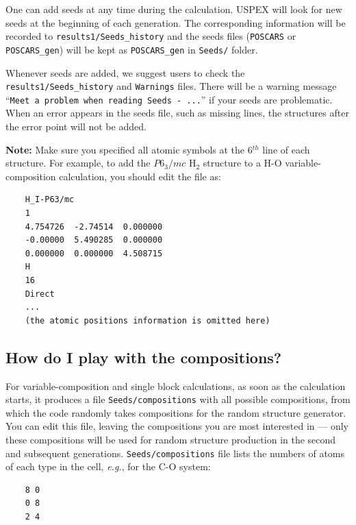 \documentclass[12pt]{article}
\newcommand{\file}[1]{\texttt{#1}}
\begin{document}
One can add  seeds at any time during the calculation. USPEX will look for new
seeds at the beginning of each generation. The corresponding information will be
recorded to \file{results1/Seeds\_history} and the seeds files (\file{POSCARS}
or \file{POSCARS\_gen}) will be kept as \file{POSCARS\_gen} in \file{Seeds/}
folder.

Whenever seeds are added, we suggest users to check the
\file{results1/Seeds\_history} and \file{Warnings} files. There will be a
warning message ``\texttt{Meet a problem when reading Seeds - ...}'' if your
seeds are problematic. When an error appears in the seeds file, such as missing
lines, the structures after the error point will not be added.

\textbf{Note:} Make sure you specified all atomic symbols at the 6$^{th}$ line
of each structure. For example, to add the $P6_{3}/mc$ H$_2$ structure to a H-O
variable-composition calculation, you should edit the file as:

{\footnotesize
\begin{verbatim}
    H_I-P63/mc
    1
    4.754726  -2.74514  0.000000
    -0.00000  5.490285  0.000000
    0.000000  0.000000  4.508715
    H
    16
    Direct
    ...
    (the atomic positions information is omitted here)
\end{verbatim}
}



\subsection{How do I play with the compositions?}\label{faq_compositions}

For variable-composition and single block calculations, as soon as the
calculation starts, it produces a file \file{Seeds/compositions} with all
possible compositions, from which the code randomly takes compositions for the
random structure generator. You can edit this file, leaving the compositions you
are most interested in --- only these compositions will be used for random
structure production in the second and subsequent generations.
\file{Seeds/compositions} file lists the numbers of atoms of each type in the
cell, \emph{e.g.}, for the C-O system:

\begin{verbatim}
    8 0
    0 8
    2 4
\end{verbatim}
\end{document}
